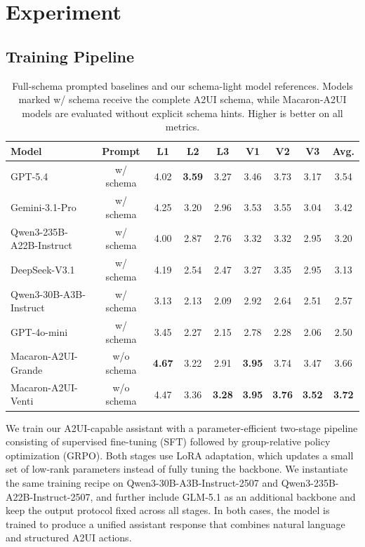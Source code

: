 \section{Experiment}
\label{sec:exp}
\subsection{Training Pipeline}
\label{subsec:training-pipeline}

\begin{table}[t]
\centering
\small
\setlength{\tabcolsep}{5pt}
\begin{tabular}{l|c|ccc|ccc|c}
\toprule
Model & Prompt & L1 & L2 & L3 & V1 & V2 & V3 & Avg. \\
\midrule
GPT-5.4 & w/ schema & 4.02 & \textbf{3.59} & 3.27 & 3.46 & 3.73 & 3.17 & 3.54 \\
Gemini-3.1-Pro & w/ schema & 4.25 & 3.20 & 2.96 & 3.53 & 3.55 & 3.04 & 3.42 \\
Qwen3-235B-A22B-Instruct & w/ schema & 4.00 & 2.87 & 2.76 & 3.32 & 3.32 & 2.95 & 3.20 \\ 
DeepSeek-V3.1 & w/ schema& 4.19 & 2.54 & 2.47 & 3.27 & 3.35 & 2.95 & 3.13 \\
Qwen3-30B-A3B-Instruct & w/ schema & 3.13 & 2.13 & 2.09 & 2.92 & 2.64 & 2.51 & 2.57 \\
GPT-4o-mini & w/ schema & 3.45 & 2.27 & 2.15 & 2.78 & 2.28 & 2.06 & 2.50 \\
\midrule
Macaron-A2UI-Grande & w/o schema & \textbf{4.67} & 3.22 & 2.91 & \textbf{3.95} & 3.74 & 3.47 & 3.66 \\
Macaron-A2UI-Venti & w/o schema & 4.47 &3.36 &\textbf{3.28} &\textbf{3.95} & \textbf{3.76} &\textbf{3.52} & \textbf{3.72} \\
\bottomrule
\end{tabular}
\caption{Full-schema prompted baselines and our schema-light model references. Models marked w/ schema receive the complete A2UI schema, while Macaron-A2UI models are evaluated without explicit schema hints. Higher is better on all metrics.}
\label{tab:full_prompt_results}
\end{table}

We train our A2UI-capable assistant with a parameter-efficient two-stage pipeline consisting of supervised fine-tuning (SFT) followed by group-relative policy optimization (GRPO). Both stages use LoRA adaptation, which updates a small set of low-rank parameters instead of fully tuning the backbone. We instantiate the same training recipe on Qwen3-30B-A3B-Instruct-2507 and Qwen3-235B-A22B-Instruct-2507, and further include GLM-5.1 as an additional backbone and keep the output protocol fixed across all stages. In both cases, the model is trained to produce a unified assistant response that combines natural language and structured A2UI actions.

